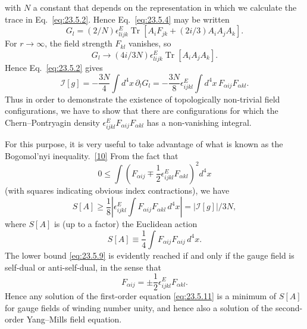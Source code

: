 with $N$ a constant that depends on the representation in which we
calculate the trace in Eq.~\eqref{eq:23.5.2}. Hence
Eq.~\eqref{eq:23.5.4} may be written
\begin{equation}
G_l=(2/N)\epsilon^E_{lijk}\operatorname{Tr}\left[
A_iF_{jk}+(2i/3)A_iA_jA_k
\right].
\tag{23.5.6}\label{eq:23.5.6}
\end{equation}
For $r\to\infty$, the field strength $F_{kl}$ vanishes, so
\begin{equation}
G_l\longrightarrow(4i/3N)\epsilon^E_{lijk}
\operatorname{Tr}[A_iA_jA_k].
\tag{23.5.7}\label{eq:23.5.7}
\end{equation}
Hence Eq.~\eqref{eq:23.5.2} gives
\begin{equation}
\mathcal I[g]=-\frac{3N}{4}\int d^4x\,\partial_lG_l
=-\frac{3N}{8}\epsilon^E_{ijkl}
\int d^4x\,F_{\alpha ij}F_{\alpha kl}.
\tag{23.5.8}\label{eq:23.5.8}
\end{equation}
Thus in order to demonstrate the existence of topologically non-trivial
field configurations, we have to show that there are configurations for
which the Chern--Pontryagin density
$\epsilon^E_{ijkl}F_{\alpha ij}F_{\alpha kl}$ has a non-vanishing
integral.

For this purpose, it is very useful to take advantage of what is known as
the Bogomol'nyi inequality.~\hyperref[ch23-ref-10]{[10]} From the fact
that
\[
0\leq\int\left(
F_{\alpha ij}\mp\frac12\epsilon^E_{ijkl}F_{\alpha kl}
\right)^2d^4x
\]
(with squares indicating obvious index contractions), we have
\begin{equation}
S[A]\geq\frac18\left|
\epsilon^E_{ijkl}\int F_{\alpha ij}F_{\alpha kl}\,d^4x
\right|
=|\mathcal I[g]|/3N,
\tag{23.5.9}\label{eq:23.5.9}
\end{equation}
where $S[A]$ is (up to a factor) the Euclidean action
\begin{equation}
S[A]\equiv\frac14\int F_{\alpha ij}F_{\alpha ij}\,d^4x.
\tag{23.5.10}\label{eq:23.5.10}
\end{equation}
The lower bound \eqref{eq:23.5.9} is evidently reached if and only if the
gauge field is self-dual or anti-self-dual, in the sense that
\begin{equation}
F_{\alpha ij}=\pm\frac12\epsilon^E_{ijkl}F_{\alpha kl}.
\tag{23.5.11}\label{eq:23.5.11}
\end{equation}
Hence any solution of the first-order equation \eqref{eq:23.5.11} is a
minimum of $S[A]$ for gauge fields of winding number unity, and hence
also a solution of the second-order Yang--Mills field equation.

